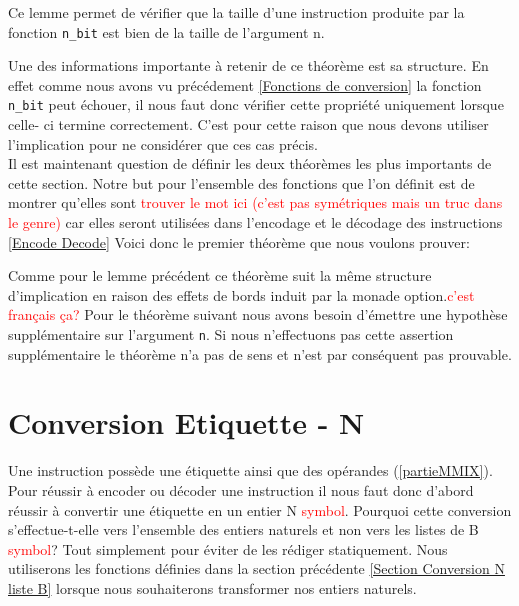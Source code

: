 \documentclass {article}
\newcommand{\codefrom}[3]
           {}
\theoremstyle{definition}
\theoremstyle{remark}
\newcommand{\todo}[1]{\textcolor{red}{#1}}
\newcommand{\fun}[1]{\lstinline!#1!}
\begin{document}
Ce lemme permet de vérifier que la taille d'une instruction produite par
la fonction \fun{n_bit} est bien de la taille de l'argument n.


Une des informations importante à retenir de ce théorème est sa structure.
En effet comme nous avons vu précédement \ref{Fonctions de conversion} la
fonction \fun{n_bit} peut échouer, il nous faut donc vérifier cette propriété
uniquement lorsque celle- ci termine correctement. C'est pour cette raison
que nous devons utiliser l'implication pour ne considérer que ces cas précis. \\

Il est maintenant question de définir les deux théorèmes les plus importants de
cette section. Notre but pour l'ensemble des fonctions que l'on définit est de
montrer qu'elles sont \todo{trouver le mot ici (c'est pas symétriques mais un truc dans le genre)}
car elles seront utilisées dans l'encodage et le décodage des instructions \ref{Encode Decode}
Voici donc le premier théorème que nous voulons prouver:

\codefrom{src}{binary}{nbitn}

Comme pour le lemme précédent ce théorème suit la même structure d'implication en raison des effets
de bords induit par la monade option.\todo{c'est français ça?}
Pour le théorème suivant nous avons besoin d'émettre une hypothèse supplémentaire sur l'argument
\fun{n}. Si nous n'effectuons pas cette assertion supplémentaire le
théorème n'a pas de sens et n'est par conséquent pas prouvable.

\codefrom{src}{binary}{bitnbit}





\section{Conversion Etiquette - N}
\label{partieOpcode}

Une instruction possède une étiquette ainsi que des opérandes (\ref{partieMMIX}).
Pour réussir à encoder ou décoder une instruction il nous faut donc d'abord
réussir à convertir une étiquette en un entier N \todo{symbol}.
Pourquoi cette conversion s'effectue-t-elle vers l'ensemble des entiers naturels
et non vers les listes de B \todo{symbol}? Tout simplement pour éviter
de les rédiger statiquement. Nous utiliserons les fonctions définies dans
la section précédente \ref{Section Conversion N liste B} lorsque nous souhaiterons transformer nos entiers naturels.
\end{document}
